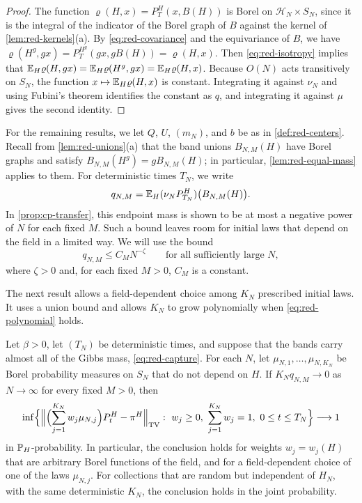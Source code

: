 \begin{proof}
The function $\varrho(H,x)=P^H_T(x,B(H))$ is Borel on $\mathcal H_N\times S_N$, since it is the integral of the indicator of the Borel graph of $B$ against the kernel of \cref{lem:red-kernels}(a). By \eqref{eq:red-covariance} and the equivariance of $B$, we have $\varrho(H^g,gx)=P^{H^g}_T(gx,gB(H))=\varrho(H,x)$. Then \eqref{eq:red-isotropy} implies that $\mathbb E_H\varrho(H,gx)=\mathbb E_H\varrho(H^g,gx)=\mathbb E_H\varrho(H,x)$. Because $O(N)$ acts transitively on $S_N$, the function $x\mapsto\mathbb E_H\varrho(H,x)$ is constant. Integrating it against $\nu_N$ and using Fubini's theorem identifies the constant as $q$, and integrating it against $\mu$ gives the second identity.
\end{proof}

For the remaining results, we let $Q$, $U$, $(m_N)$, and $b$ be as in \cref{def:red-centers}. Recall from \cref{lem:red-unions}(a) that the band unions $B_{N,M}(H)$ have Borel graphs and satisfy $B_{N,M}(H^g)=gB_{N,M}(H)$; in particular, \cref{lem:red-equal-mass} applies to them. For deterministic times $T_N$, we write
\begin{equation*}
q_{N,M}=\mathbb E_H(\nu_NP^H_{T_N})\bigl(B_{N,M}(H)\bigr).
\end{equation*}
In \cref{prop:cp-transfer}, this endpoint mass is shown to be at most a negative power of $N$ for each fixed $M$. Such a bound leaves room for initial laws that depend on the field in a limited way. We will use the bound
\begin{equation}\label{eq:red-polynomial}
q_{N,M}\le C_MN^{-\zeta}\qquad\text{for all sufficiently large }N,
\end{equation}
where $\zeta>0$ and, for each fixed $M>0$, $C_M$ is a constant.

The next result allows a field-dependent choice among $K_N$ prescribed initial laws. It uses a union bound and allows $K_N$ to grow polynomially when \eqref{eq:red-polynomial} holds.

\begin{corollary}\label{cor:red-selection}
Let $\beta>0$, let $(T_N)$ be deterministic times, and suppose that the bands carry almost all of the Gibbs mass, \eqref{eq:red-capture}. For each $N$, let $\mu_{N,1},\dots,\mu_{N,K_N}$ be Borel probability measures on $S_N$ that do not depend on $H$. If $K_Nq_{N,M}\to0$ as $N\to\infty$ for every fixed $M>0$, then
\begin{equation}\label{eq:red-selection}
\inf\Bigl\{\Bigl\|\Bigl(\sum_{j=1}^{K_N}w_j\mu_{N,j}\Bigr)P^H_t-\pi^H\Bigr\|_{\TV}:\ w_j\ge0,\ \sum_{j=1}^{K_N}w_j=1,\ 0\le t\le T_N\Bigr\}\longrightarrow1
\end{equation}
in $\mathbb P_H$-probability. In particular, the conclusion holds for weights $w_j=w_j(H)$ that are arbitrary Borel functions of the field, and for a field-dependent choice of one of the laws $\mu_{N,j}$. For collections that are random but independent of $H_N$, with the same deterministic $K_N$, the conclusion holds in the joint probability.
\end{corollary}

